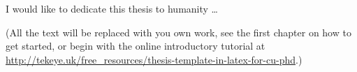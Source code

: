 
\begin{dedication} 

I would like to dedicate this thesis to humanity \dots

(All the text will be replaced with you own work, see the first chapter on how to get started, or begin with the online introductory tutorial at \url{http://tekeye.uk/free_resources/thesis-template-in-latex-for-cu-phd}.)

\end{dedication}

